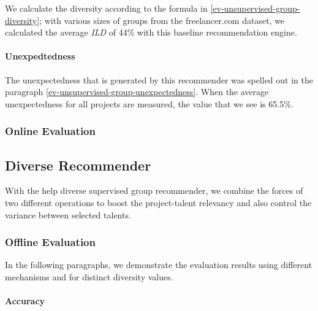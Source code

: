 We calculate the diversity according to the formula in \ref{ev-unsupervised-group-diversity}; with various sizes of groups from the freelancer.com dataset, we calculated the average \textit{ILD} of 44\% with this baseline recommendation engine.

\paragraph{Unexpedtedness}

The unexpectedness that is generated by this recommender was spelled out in the paragraph \ref{ev-unsupervised-group-unexpectedness}. When the average unexpectedness for all projects are measured, the value that we see is 65.5\%.


\subsubsection{Online Evaluation}


\subsection{Diverse Recommender}

With the help diverse supervised group recommender, we combine the forces of two different operations to boost the project-talent relevancy and also control the variance between selected talents.

\subsubsection{Offline Evaluation}

In the following paragraphs, we demonstrate the evaluation results using different mechanisms and for distinct diversity values.

\paragraph{Accuracy}

